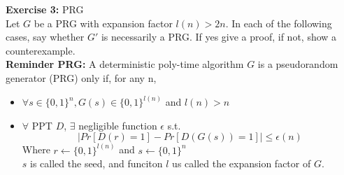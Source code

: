 \documentclass[12pt]{article}
\begin{document}
\textbf{Exercise 3:} PRG\\
Let $G$ be a PRG with expansion factor $l(n)>2n$. In each of the following cases, say whether $G'$ is necessarily a PRG. If yes give a proof, if not, show a counterexample.\\
\textbf{Reminder PRG:} A deterministic poly-time algorithm $G$ is a pseudorandom generator (PRG) only if, for any n,
\begin{itemize}
\item $\forall s \in \{0,1\}^n, G(s) \in \{0,1\}^{l(n)}$ and $l(n) > n$
\item $\forall$ PPT $D$, $\exists$ negligible function $\epsilon$ s.t.
\begin{equation*}
|Pr[D(r)=1]-Pr[D(G(s))=1]| \le \epsilon(n)
\end{equation*}
Where $r\leftarrow \{0,1\}^{l(n)}$ and $s\leftarrow \{0,1\}^n$\\
$s$ is called the seed, and funciton $l$ us called the expansion factor of $G$.
\end{itemize}
\end{document}
